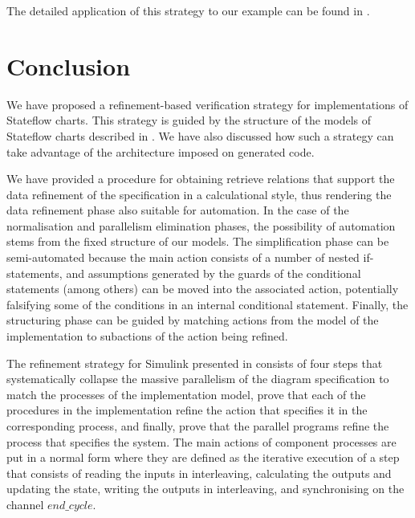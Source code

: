 \documentclass[submission]{eptcs}
\begin{document}
The detailed application of this strategy to our example can be found in \cite{Miyazawa2011b}.

\section{Conclusion}
\label{sec:conclusion}

We have proposed a refinement-based verification strategy for implementations of Stateflow charts. This strategy is guided by the structure of the models of Stateflow charts described in \cite{Miyazawa2011a}. We have also discussed how such a strategy can take advantage of the architecture imposed on generated code.

We have provided a procedure for obtaining retrieve relations that support the data refinement of the specification in a calculational style, thus rendering the data refinement phase also suitable for automation. In the case of the normalisation and parallelism elimination phases, the possibility of automation stems from the fixed structure of our models. The simplification phase
can be semi-automated because the main action consists of a number of nested if-statements, and assumptions generated by the guards of the conditional statements (among others) can be moved into the associated action, potentially falsifying some of the conditions in an internal conditional statement. Finally, the structuring phase can be guided by matching actions from the model of the implementation to subactions of the action being refined.

The refinement strategy for Simulink presented in
\cite{Cavalcanti2011} consists of four steps that systematically
collapse the massive parallelism of the diagram specification to
match the processes of the implementation model, prove that each of
the procedures in the implementation refine the action that specifies
it in the corresponding process, and finally, prove that the parallel
programs refine the process that specifies the system. The main
actions of component processes are put in a normal form where
they are defined as the iterative execution of a step that consists
 of reading the inputs in interleaving, calculating the
outputs and updating the state, writing the outputs in interleaving,
and synchronising on the channel $end\_cycle$.
\end{document}
